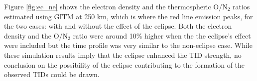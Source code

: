 \documentclass[crop=false,class=mitthesis,oneside,font=12pt]{standalone}
\begin{document}
Figure \ref{fig:ec_ne} shows the electron density and  the thermospheric O/N$_2$ ratios estimated using GITM at 250 km, which is where the red line emission peaks, for the two cases: with and without the effect of the eclipse. Both the electron density and the O/N$_2$ ratio were around 10\% higher when the the eclipse's effect were included but the time profile was very similar to the non-eclipse case.  While these simulation results imply that the eclipse enhanced the TID strength, no conclusion on the possibility of the eclipse contributing to the formation of the observed TIDs could be drawn.  
% 
% 
% 
\end{document}
